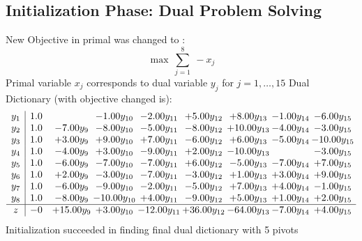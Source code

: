 \documentclass[9pt]{article}
\begin{document}
\subsection{Initialization Phase: Dual Problem Solving}
New Objective in primal was changed to : \[ \max\ \sum_{j=1}^{8}\ - x_j \] 
Primal variable $x_j$ corresponds to dual variable $y_j$ for $j = 1,\ldots,15$
Dual Dictionary (with objective changed is): 
\[\begin{array}{c| c c@{\hskip 2pt} c@{\hskip 2pt} c@{\hskip 2pt} c@{\hskip 2pt} c@{\hskip 2pt} c@{\hskip 2pt} c@{\hskip 2pt} }
 y_{1}   &  1.0  &   & -1.00 y_{10} & -2.00 y_{11} & +  5.00 y_{12} & +  8.00 y_{13} & -1.00 y_{14} & -6.00 y_{15}\\
 y_{2}   &  1.0 & -7.00 y_{9} & -8.00 y_{10} & -5.00 y_{11} & -8.00 y_{12} & + 10.00 y_{13} & -4.00 y_{14} & -3.00 y_{15}\\
 y_{3}   &  1.0 & +  3.00 y_{9} & +  9.00 y_{10} & +  7.00 y_{11} & -6.00 y_{12} & +  6.00 y_{13} & -5.00 y_{14} & -10.00 y_{15}\\
 y_{4}   &  1.0 & -4.00 y_{9} & +  3.00 y_{10} & -9.00 y_{11} & +  2.00 y_{12} & -10.00 y_{13} &   & -3.00 y_{15}\\
 y_{5}   &  1.0 & -6.00 y_{9} & -7.00 y_{10} & -7.00 y_{11} & +  6.00 y_{12} & -5.00 y_{13} & -7.00 y_{14} & +  7.00 y_{15}\\
 y_{6}   &  1.0 & +  2.00 y_{9} & -3.00 y_{10} & -7.00 y_{11} & -3.00 y_{12} & +  1.00 y_{13} & +  3.00 y_{14} & +  9.00 y_{15}\\
 y_{7}   &  1.0 & -6.00 y_{9} & -9.00 y_{10} & -2.00 y_{11} & -5.00 y_{12} & +  7.00 y_{13} & +  4.00 y_{14} & -1.00 y_{15}\\
 y_{8}   &  1.0 & -8.00 y_{9} & -10.00 y_{10} & +  4.00 y_{11} & -9.00 y_{12} & +  5.00 y_{13} & +  1.00 y_{14} & +  2.00 y_{15}\\
\hline
z    &  -0 & + 15.00 y_{9} & +  3.00 y_{10} & -12.00 y_{11} & + 36.00 y_{12} & -64.00 y_{13} & -7.00 y_{14} & +  4.00 y_{15}\\
\end{array}\]
Initialization succeeded in finding final dual dictionary with 5 pivots
\end{document}
